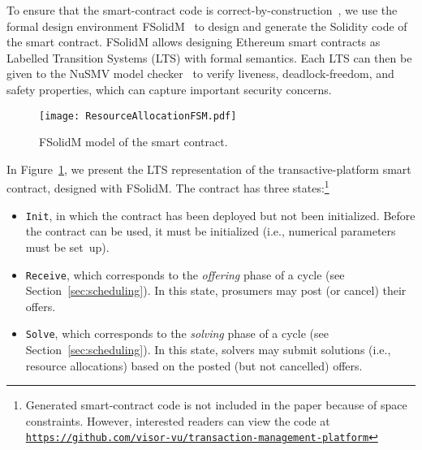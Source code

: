 To ensure that the smart-contract code is correct-by-construction~\cite{sifakis2013RSD}, we use the formal design environment FSolidM~\cite{mavridou2018designing} to design and generate the Solidity code of the smart contract. FSolidM allows designing Ethereum smart contracts as Labelled Transition Systems (LTS) with formal semantics. Each LTS can then be given to the NuSMV model checker~\cite{cimatti2002nusmv} to verify liveness, deadlock-freedom, and safety properties, which can capture important security concerns. %


\begin{figure}[t]
\centering
\texttt{[image: ResourceAllocationFSM.pdf]}
\caption{FSolidM model of the \Platform smart contract.}
\label{fig:FSM}
\end{figure}


In Figure~\ref{fig:FSM}, we present the LTS representation of the transactive-platform smart contract, designed with FSolidM. The contract has three states:\footnote{Generated smart-contract code is not included in the paper because of space constraints. However, interested readers can view the code at \texttt{\url{https://github.com/visor-vu/transaction-management-platform}}}
\begin{itemize}[noitemsep, topsep=0pt, leftmargin=1em]
    \item \texttt{Init}, in which the contract has been deployed but  not been initialized. Before the contract can be used, it must be initialized (i.e., numerical parameters must be set~up).
    \item \texttt{Receive}, which corresponds to the \emph{offering} phase of a cycle (see Section~\ref{sec:scheduling}).
    In this state, prosumers may post (or cancel) their offers.
    \item \texttt{Solve}, which corresponds to the \emph{solving} phase of a cycle (see Section~\ref{sec:scheduling}). In this state, solvers may submit solutions (i.e., resource allocations) based on the posted (but not cancelled) offers.
\end{itemize}

